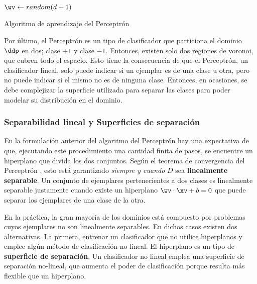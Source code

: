 \begin{algorithm}[H]
$\wv \leftarrow random(d+1)$\;
\caption{Algoritmo de aprendizaje del Perceptrón} 
\end{algorithm}
\vspace{10pt}


Por último, el Perceptrón es un tipo de clasificador que particiona el dominio $\ddp$ en dos; clase $+1$ y clase $-1$. Entonces, existen solo dos regiones de voronoi, que cubren todo el espacio. Esto tiene la consecuencia de que el Perceptrón, un clasificador lineal, solo puede indicar si un ejemplar es de una clase u otra, pero no puede indicar si el mismo no es de ninguna clase. Entonces, en ocasiones, se debe complejizar la superficie utilizada para separar las clases para poder modelar su distribución en el dominio.

\subsubsection{Separabilidad lineal y Superficies de separación}

En la formulación anterior del algoritmo del Perceptrón hay una expectativa de que, ejecutando este procedimiento una cantidad finita de pasos, se encuentre un hiperplano que divida los dos conjuntos. Según el teorema de convergencia del Perceptrón \cite{haykin1994}, esto está garantizado  \textit{siempre y cuando} $D$ sea \textbf{linealmente separable}. Un conjunto de ejemplares pertenecientes a dos clases es linealmente separable justamente cuando existe un hiperplano $\wv \cdot \xv +b=0$ que puede separar los ejemplares de una clase de la otra.



En la práctica, la gran mayoría de los dominios está compuesto por problemas cuyos ejemplares no son linealmente separables. En dichos casos existen dos alternativas. La primera, entrenar un clasificador que no utilice hiperplanos y emplee algún método de clasificación no lineal. El hiperplano es un tipo de \textbf{superficie de separación}. Un clasificador no lineal emplea una superficie de separación no-lineal, que aumenta el poder de clasificación porque resulta más flexible que un hiperplano.

